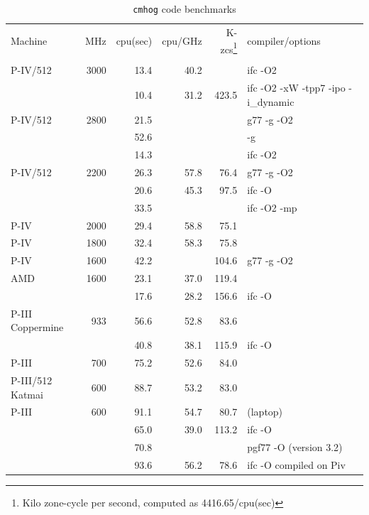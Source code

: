 \documentclass[10pt,dvips]{article}
\begin{document}
\begin{table}[htbp]
\centering
\medskip
\caption{{\tt cmhog} code benchmarks}
\begin{tabular}{|l|r|r|r|r|l|} \hline
Machine & MHz  	      
	& cpu(sec) 
	& cpu/GHz 
	& K-zcs\footnote{Kilo zone-cycle per second, computed as 4416.65/cpu(sec)}
	& compiler/options \\ 
&&&&&  \\ \hline
P-IV/512        & 3000  &        13.4 & 40.2  &       & ifc -O2 \\  %
                &       &        10.4 & 31.2  & 423.5 & ifc -O2 -xW -tpp7 -ipo -i\_dynamic \\
P-IV/512	& 2800	&	 21.5 &       &       & g77 -g -O2 \\  %
                &       &        52.6 &       &       & -g \\
                &       &        14.3 &       &       & ifc -O2 \\    
P-IV/512	& 2200	&	 26.3 & 57.8  &  76.4 & g77 -g -O2 \\  %
                &       &        20.6 & 45.3  &  97.5 & ifc -O \\
		&       &        33.5 &       &       & ifc -O2 -mp \\
P-IV		& 2000  &	 29.4 & 58.8  &  75.1 &  \\  %
P-IV		& 1800  &	 32.4 & 58.3  &  75.8 &  \\  %
P-IV            & 1600  &        42.2 &       & 104.6 & g77 -g -O2 \\ %
AMD 		& 1600  &        23.1 & 37.0  & 119.4 & \\ %
                &       &        17.6 & 28.2  & 156.6 & ifc -O \\
P-III Coppermine & 933   &	 56.6 & 52.8  &  83.6 & \\ %
                 &       &       40.8 & 38.1  & 115.9 & ifc -O \\
P-III		& 700   &	 75.2 & 52.6  &  84.0 & \\ %
P-III/512 Katmai & 600	&	 88.7 & 53.2  &  83.0 &  \\ %
P-III		& 600	&	 91.1 & 54.7  &  80.7 & (laptop) \\ %
 		& 	&	 65.0 & 39.0  & 113.2 & ifc -O \\
		&	&	 70.8 &       &       & pgf77 -O (version 3.2) \\
		&	&	 93.6 & 56.2  &  78.6 & ifc -O compiled on Piv \\

\end{tabular}
\end{table}
\end{document}
